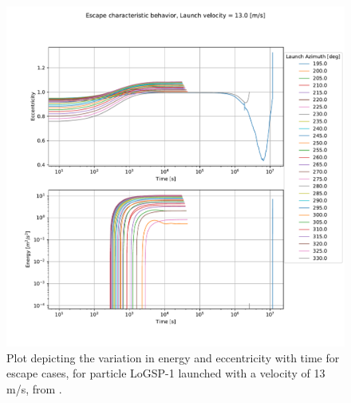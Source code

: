 \FloatBarrier
\begin{figure}[htb]
\centering
\captionsetup{justification=centering}
\includegraphics[width=\textwidth, height=0.4\textheight, keepaspectratio=true]{trailing_edge_perturbations/logsp1_escape_energy_ecc_13ms_solarPhase225.pdf}
\caption{Plot depicting the variation in energy and eccentricity with time for escape cases, for particle LoGSP-1 launched with a velocity of 13 m/s, from \protect{}.}
\label{fig:trailingEdge_logsp1_escape_energy_ecc_13ms_solar225}
\end{figure}
\FloatBarrier
